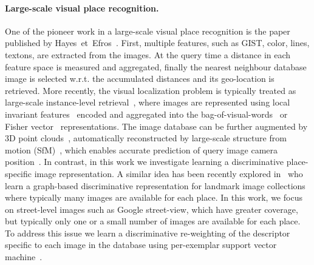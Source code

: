 \paragraph{Large-scale visual place recognition.}
    \textcolor{petr}{
    One of the pioneer work in a large-scale visual place recognition is the paper published by Hayes~et~Efros~\cite{Hays2008}. First, multiple features, such as GIST, color, lines, textons, are extracted from the images. At the query time a distance in each feature space is measured and aggregated, finally the nearest neighbour database image is selected w.r.t. the accumulated distances and its geo-location is retrieved.
    More recently,
    }
    the visual localization problem is typically treated as large-scale instance-level retrieval~\cite{Cummins09,Chen11,Gronat13,Knopp2010,Schindler07,Torii2013,Zamir10}, where images are represented using local invariant features~\cite{Lowe04} encoded and aggregated into the bag-of-visual-words~\cite{Csurka04,Sivic03} or Fisher vector~\cite{Jegou12} representations. 
    The image database can be further augmented by 3D point clouds~\cite{Klinger13}, automatically
    reconstructed by large-scale structure from motion
    (SfM)~\cite{Agarwal-ICCV-2009,Klinger13}, which enables accurate prediction of query image camera position~\cite{Li12,Sattler12}.
    In contrast, in this work we investigate learning a discriminative place-specific image representation. A similar idea has been recently explored in~\cite{Cao13} 
    who learn a graph-based discriminative representation for landmark image collections where typically many images are available for each place.
    In this work, we focus on street-level images such as Google street-view, which have greater coverage, but typically only one or a small number of images are  available for each place.  To address this issue we learn a discriminative re-weighting of the descriptor specific to each image in the database using per-exemplar support vector machine~\cite{Malisiewicz11}.
    
